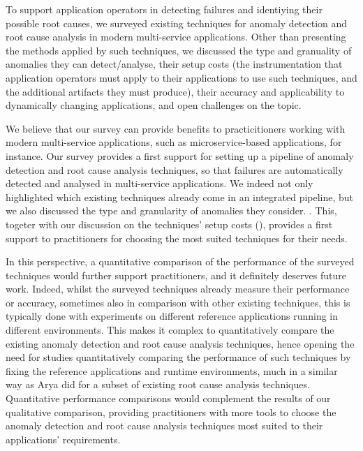 To support application operators in detecting failures and identiying their possible root causes, we surveyed existing techniques for anomaly detection and root cause analysis  in modern multi-service applications. 
Other than presenting the methods applied by such techniques, we discussed the type and granuality of anomalies they can detect/analyse, their setup costs (\viz the instrumentation that application operators must apply to their applications to use such techniques, and the additional artifacts they must produce), their accuracy and applicability to dynamically changing applications, and open challenges on the topic.

We believe that our survey can provide benefits to practicitioners working with modern multi-service applications, such as microservice-based applications, for instance. 
Our survey provides a first support for setting up a pipeline of anomaly detection and root cause analysis techniques, so that failures are automatically detected and analysed in multi-service applications.
We indeed not only highlighted which existing techniques already come in an integrated pipeline, but we also discussed the type and granularity of anomalies they consider. 
.
This, togeter with our discussion on the techniques' setup costs (), provides a first support to practitioners for choosing the most suited techniques for their needs.

In this perspective, a quantitative comparison of the performance of the surveyed techniques would further support practitioners, and it definitely deserves future work. 
Indeed, whilst the surveyed techniques already measure their performance or accuracy, sometimes also in comparison with other existing techniques, this is typically done with experiments on different reference applications running in different environments.
This makes it complex to quantitatively compare the existing anomaly detection and root cause analysis techniques, hence opening the need for studies quantitatively comparing the performance of such techniques by fixing the reference applications and runtime environments, much in a similar way as Arya \etal \cite{Arya2021_EvaluationCausalInferenceAIOps} did for a subset of existing root cause analysis techniques.  
Quantitative performance comparisons would complement the results of our qualitative comparison, providing practitioners with more tools to choose the anomaly detection and root cause analysis techniques most suited to their applications' requirements.

